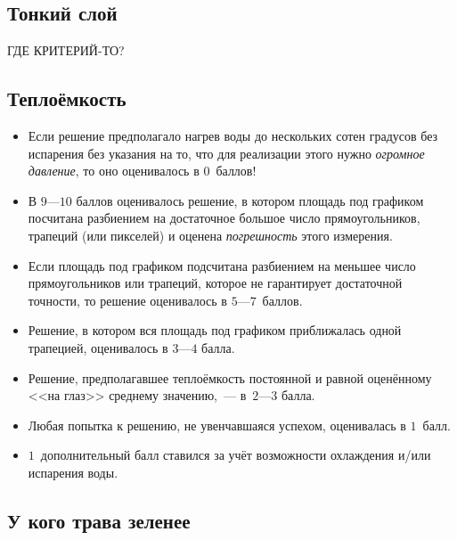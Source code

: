 \documentclass[10pt, a4paper, oneside, fleqn]{article}
\newcommand\т{~--- }
\begin{document}
\subsection{Тонкий слой}

ГДЕ КРИТЕРИЙ-ТО?

\subsection{Теплоёмкость}

\begin{itemize}
\item Если решение предполагало нагрев воды до нескольких сотен градусов без испарения
без указания на то, что для реализации этого нужно \emph{огромное давление}, то оно оценивалось в $0$~баллов!

\item В $9$---$10$ баллов оценивалось решение, в котором площадь под графиком посчитана разбиением
на достаточное большое число прямоугольников, трапеций (или пикселей) и оценена \emph{погрешность} этого
измерения.

\item Если площадь под графиком подсчитана разбиением на меньшее число прямоугольников или трапеций,
которое не гарантирует достаточной точности, то решение оценивалось в $5$---$7$~баллов.

\item Решение, в котором вся площадь под графиком приближалась одной трапецией, оценивалось в $3$---$4$ балла.

\item Решение, предполагавшее теплоёмкость постоянной и равной оценённому <<на глаз>> среднему значению,\т в~$2$---$3$ балла.

\item Любая попытка к решению, не увенчавшаяся успехом, оценивалась в $1$~балл.

\item $1$~дополнительный балл ставился за учёт возможности охлаждения и/или испарения воды.
\end{itemize}

\subsection{У кого трава зеленее}
\end{document}

